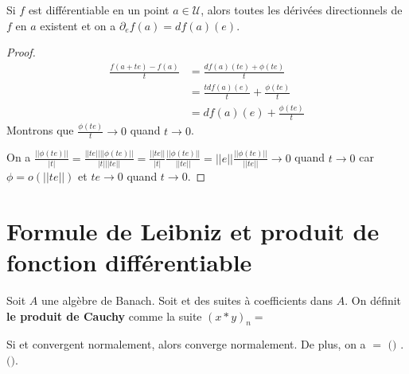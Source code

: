 \begin{proposition}
	Si $f$ est différentiable en un point $a \in \mathcal{U}$, alors toutes les
	dérivées directionnels de $f$ en $a$ existent et on a $\partial_{e}f(a) =
	df(a)(e)$.
\end{proposition}

\begin{proof}
\begin{align}
	\displaystyle \frac{f(a + te) - f(a)}{t} 
	&= \frac{df(a)(te) + \phi(te)}{t}\\
	&= \frac{t df(a)(e)}{t} + \frac{\phi(te)}{t} \\
	&= df(a)(e) + \frac{\phi(te)}{t}
\end{align}
	Montrons que $\displaystyle \frac{\phi(te)}{t} \rightarrow 0$ quand $t
	\rightarrow 0$.

	On a $\displaystyle \frac{||\phi(te)||}{|t|} = \frac{||te||
	||\phi(te)||}{|t| ||te||} = \frac{||te||}{|t|}
	\frac{||\phi(te)||}{||te||} = ||e|| \frac{||\phi(te)||}{||te||} \rightarrow
	0$ quand $t \rightarrow 0$ car $\phi = o(||te||)$ et $te \rightarrow 0$
	quand $t \rightarrow 0$.
\end{proof}

\begin{definition}
\label{partial_application_definition}
	

\end{definition}

\section{Formule de Leibniz et produit de fonction différentiable}

\begin{definition}
	Soit $A$ une algèbre de Banach. Soit  et
	 des suites à coefficients dans $A$.
	On définit \textbf{le produit de Cauchy} comme la suite ${(x \ast y)}_{n} =
	$
\end{definition}

\begin{theorem}
\label{theorem_cauchy_mertens}
Si  et  convergent
normalement, alors  converge normalement.
De plus, on a  $ = $
$($$)$ . $($$)$.
\end{theorem}


